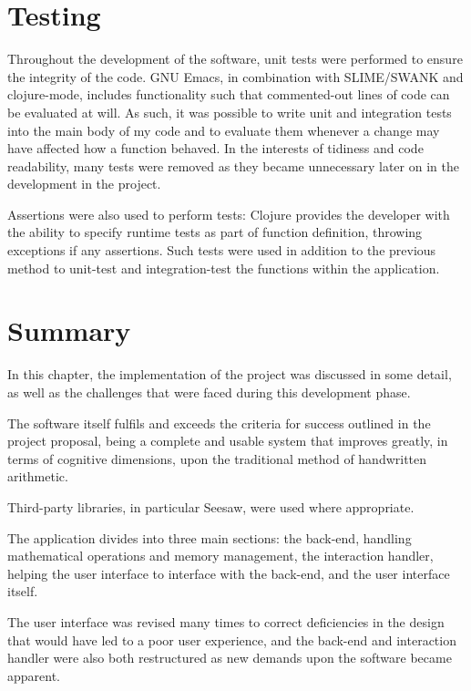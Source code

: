 \documentclass[12pt,twoside,notitlepage,xetex]{report}
\begin{document}
\section{Testing}

Throughout the development of the software, unit tests were performed to ensure the integrity of the code.  GNU Emacs, in combination with SLIME/SWANK and clojure-mode, includes functionality such that commented-out lines of code can be evaluated at will.  As such, it was possible to write unit and integration tests into the main body of my code and to evaluate them whenever a change may have affected how a function behaved.  In the interests of tidiness and code readability, many tests were removed as they became unnecessary later on in the development in the project.

Assertions were also used to perform tests: Clojure provides the developer with the ability to specify runtime tests as part of function definition, throwing exceptions if any assertions.  Such tests were used in addition to the previous method to unit-test and integration-test the functions within the application.

\section{Summary}

In this chapter, the implementation of the project was discussed in some detail, as well as the challenges that were faced during this development phase.

The software itself fulfils and exceeds the criteria for success outlined in the project proposal, being a complete and usable system that improves greatly, in terms of cognitive dimensions, upon the traditional method of handwritten arithmetic.

Third-party libraries, in particular Seesaw, were used where appropriate.

The application divides into three main sections: the back-end, handling mathematical operations and memory management, the interaction handler, helping the user interface to interface with the back-end, and the user interface itself.

The user interface was revised many times to correct deficiencies in the design that would have led to a poor user experience, and the back-end and interaction handler were also both restructured as new demands upon the software became apparent.
\end{document}

